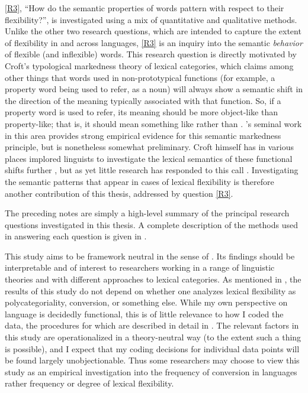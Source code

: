 \ref{R3}, \enquote{How do the semantic properties of words pattern with respect to their flexibility?}, is investigated using a mix of quantitative and qualitative methods. Unlike the other two research questions, which are intended to capture the extent of flexibility in and across languages, \ref{R3} is an inquiry into the semantic \emph{behavior} of flexible (and inflexible) words. This research question is directly motivated by Croft's \parencites*{Croft1991}{Croft2000}{Croft2001b}{Croftfc} typological markedness theory of lexical categories, which claims among other things that words used in non-prototypical functions (for example, a property word being used to refer, as a noun) will always show a semantic shift in the direction of the meaning typically associated with that function. So, if a property word is used to refer, its meaning should be more object-like than property-like; that is, it should mean something like  rather than . \citeauthor{Croft1991}'s \parencite*{Croft1991} seminal work in this area provides strong empirical evidence for this semantic markedness principle, but is nonetheless somewhat preliminary. Croft himself has in various places implored linguists to investigate the lexical semantics of these functional shifts further \parencites[440]{Croft2005}[70]{CroftLier2012}, but as yet little research has responded to this call . Investigating the semantic patterns that appear in cases of lexical flexibility is therefore another contribution of this thesis, addressed by question \ref{R3}.

The preceding notes are simply a high-level summary of the principal research questions investigated in this thesis. A complete description of the methods used in answering each question is given in .

This study aims to be framework neutral in the sense of \textcite{Haspelmath2010b}. Its findings should be interpretable and of interest to researchers working in a range of linguistic theories and with different approaches to lexical categories. As mentioned in , the results of this study do not depend on whether one analyzes lexical flexibility as polycategoriality, conversion, or something else. While my own perspective on language is decidedly functional, this is of little relevance to how I coded the data, the procedures for which are described in detail in . The relevant factors in this study are operationalized in a theory-neutral way (to the extent such a thing is possible), and I expect that my coding decisions for individual data points will be found largely unobjectionable. Thus some researchers may choose to view this study as an empirical investigation into the frequency of conversion in languages rather frequency or degree of lexical flexibility.

